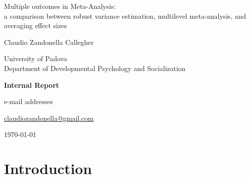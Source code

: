 \documentclass{article}\usepackage[]{graphicx}\usepackage[]{color}
\begin{document}

\begin{titlepage}

\centering
	\vspace*{2cm}
	{\LARGE Multiple outcomes in Meta-Analysis:\\
	a comparison between robust variance estimation, multilevel meta-analysis, and averaging effect sizes}\\
	\vspace{1cm}
	{\Large Claudio Zandonella Callegher\par}
  \vspace{1cm}
  {University of Padova\\
  Department of Developmental Psychology and Socialization\par}
	\vspace{2.5cm}
	{\huge\bfseries Internal Report\par}
	\vspace{1cm}
	\vfill
	e-mail addresses\par
	\href{mailto:claudio.zandonella@gmail.com}{claudiozandonella@gmail.com}

	\vfill

	{\large \today\par}
	
	\vspace{2cm}

\newpage

\clearpage
{} 


\tableofcontents

\newpage

\listoffigures
\listoftables

\end{titlepage}


\section{Introduction}

\vspace{1em}
\end{document}
